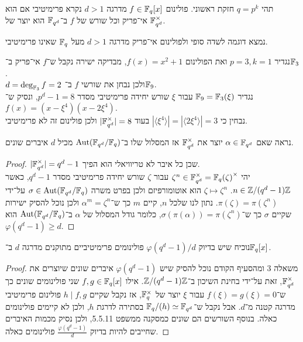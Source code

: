 \question{}
תהי $q = p^k$ חזקת ראשוני.
פולינום $f \in \mathbb{F}_q[x]$ מדרגה $d > 1$ נקרא פרימיטיבי אם הוא אי־פריק וכל שורש של $f$ ב־$\mathbb{F}_{q^d}$ הוא יוצר של $\mathbb{F}_{q^d}^\times$.

\subquestion{}
נמצא דוגמה לשדה סופי ולפולינום אי־פריק מדרגה $d > 1$ מעל $\mathbb{F}_q$ שאינו פרימיטיבי.
\begin{solution}
	נגדיר $p = 3, k = 1$ ואת הפולינום $f(x) = x^2 + 1$, מבדיקה ישירה נקבל ש־$f$ אי־פריק ב־$\mathbb{F}_3$. \\
	$d = \deg_{\mathbb{F}_3} f = 2$ ולכן נבחן את שורשי $f$ ב־$\mathbb{F}_9$. \\
	נגדיר $\mathbb{F}_9 = \mathbb{F}_3(\xi)$ עבור $\xi$ שורש יחידה פרימיטיבי מסדר $p^d - 1 = 8$, ונסיק ש־$f(x) = (x - \xi^4)(x - 2 \xi^4)$. \\
	נבחין כי $|\langle \xi^4 \rangle| = |\langle 2\xi^4 \rangle| = 3$ בעוד $|\mathbb{F}_{q^d}^\times| = 8$ ולכן פולינום זה לא פרימיטיבי.
\end{solution}

\subquestion{}
נראה שאם $\alpha \in \mathbb{F}_{q^d}$ יוצר את $\mathbb{F}_{q^d}^\times$ אז המסלול שלו ב־$\operatorname{Aut}(\mathbb{F}_{q^d} / \mathbb{F}_q)$ מכיל $d$ איברים שונים.
\begin{proof}
	$|\mathbb{F}_{q^d}^\times| = q^d - 1$ שכן כל איבר לא טריוויאלי הוא הפיך. \\
	יהי $\zeta^n \in \mathbb{F}_{q^d}^\times = {\mathbb{F}_{q}(\zeta)}^\times$ עבור $\zeta$ שורש יחידה פרימיטיבי מסדר $q^d - 1$, כאשר $n \in \mathbb{Z} / (q^d - 1) \mathbb{Z}$.
	$\zeta \mapsto \zeta^n$ הוא אוטומורפיזם ולכן בפרט משרה $\sigma \in \operatorname{Aut}(\mathbb{F}_{q^d} / \mathbb{F}_q)$ על־ידי $\pi(\zeta) = \pi(\zeta^n)$.
	נתון לנו שלכל $n$, קיים $m$ כך ש־$\alpha^m = \zeta^n$ ולכן נוכל להסיק ישירות שקיים $\sigma$ כך ש־$\sigma(\pi(\alpha)) = \pi(\zeta^n)$,
	כלומר גודל המסלול של $\alpha$ ב־$\operatorname{Aut}(\mathbb{F}_{q^d} / \mathbb{F}_q)$ הוא $\varphi(q^d - 1) \ge d$.
\end{proof}

\subquestion{}
נוכיח שיש בדיוק $\varphi(q^d - 1) / d$ פולינומים פרימיטיביים מתוקנים מדרגה $d$ ב־$\mathbb{F}_q[x]$.
\begin{proof}
	משאלה 3 ומהסעיף הקודם נוכל להסיק שיש $\varphi(q^d - 1)$ איברים שונים שיוצרים את $\mathbb{F}_{q^d}^\times$,
	זאת על־ידי בחינת השיכון ב־$\mathbb{Z} / (q^d - 1) \mathbb{Z}$.
	אילו $f, g \in \mathbb{F}_q[x]$ שני פולינומים שונים כך ש־$f(\xi) = g(\xi) = 0$ עבור $\xi$ יוצר של $\mathbb{F}_q^\times$, אז נקבל שקיים $h \mid f, g$ פולינום פרימיטיבי מדרגה קטנה מ־$d$.
	אבל נקבל ש־$\mathbb{F}_q / (h) \simeq \mathbb{F}_{q^d}$ בסתירה לדרגת $h$, ולכן לא קיימים פולינומים כאלה.
	בנוסף השורשים הם שונים כמסקנה ממשפט 5.5.11, ולכן נסיק מכמות האיברים שחייבים להיות בדיוק $\frac{\varphi(q^d - 1)}{d}$ פולינומים כאלה.
\end{proof}



